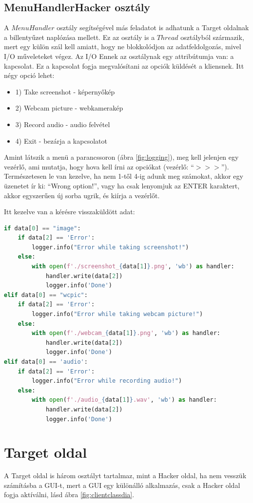 \documentclass[12pt,a4paper,oneside]{report}
\begin{document}
\subsection{MenuHandlerHacker osztály}\label{subsubsec:menuhandler}
A $MenuHandler$ osztály segítségével más feladatot is adhatunk a Target oldalnak a billentyűzet naplózása mellett. Ez az osztály is a $Thread$ osztályból származik, mert egy külön szál kell amiatt, hogy ne blokkolódjon az adatfeldolgozás, mivel I/O műveleteket végez. Az I/O  Ennek az osztálynak egy attribútumja van: a kapcsolat. Ez a kapcsolat fogja megvalósítani az opciók küldését a kliensnek. Itt négy opció lehet:
\begin{itemize}
\item 1) Take screenshot - képernyőkép
\item 2) Webcam picture - webkamerakép
\item 3) Record audio - audio felvétel
\item 4) Exit - bezárja a kapcsolatot
\end{itemize}

Amint látszik a menü a parancssoron (ábra \ref{fig:logging}), meg kell jelenjen egy vezérlő, ami mutatja, hogy hova kell írni az opciókat (vezérlő: ``$>>>$'').
Természetesen le van kezelve, ha nem 1-től 4-ig adunk meg számokat, akkor egy üzenetet ír ki: ``Wrong option!'', vagy ha csak lenyomjuk az ENTER karaktert, akkor egyszerűen új sorba ugrik, és kiírja a vezérlőt.

Itt kezelve van a kérésre visszaküldött adat:
\begin{lstlisting}[language=Python]
if data[0] == "image":
	if data[2] == 'Error':
		logger.info("Error while taking screenshot!")
	else:
		with open(f'./screenshot_{data[1]}.png', 'wb') as handler:
			handler.write(data[2])
			logger.info('Done')
elif data[0] == "wcpic":
	if data[2] == 'Error':
		logger.info("Error while taking webcam picture!")
	else:
		with open(f'./webcam_{data[1]}.png', 'wb') as handler:
			handler.write(data[2])
			logger.info('Done')
elif data[0] == 'audio':
	if data[2] == 'Error':
		logger.info("Error while recording audio!")
	else:
		with open(f'./audio_{data[1]}.wav', 'wb') as handler:
			handler.write(data[2])
			logger.info('Done')
\end{lstlisting}

\section{Target oldal}\label{subsec:client}
A Target oldal is három osztályt tartalmaz, mint a Hacker oldal, ha nem vesszük számításba a GUI-t, mert a GUI egy különálló alkalmazás, csak a Hacker oldal fogja aktíválni, lásd ábra \ref{fig:clientclassdia}.
\end{document}
